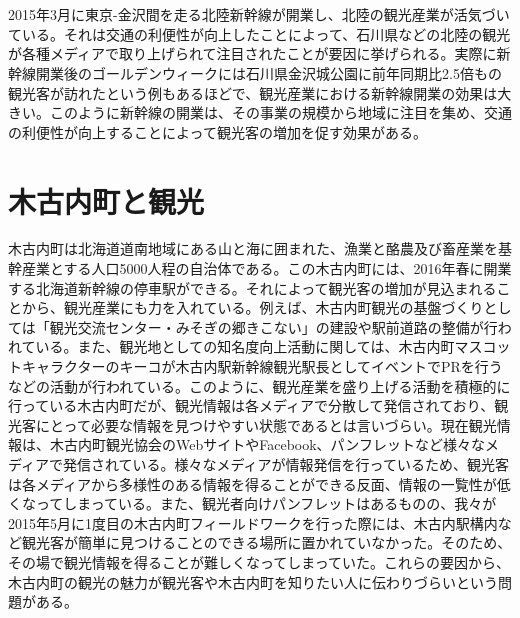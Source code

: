 \section{}
2015年3月に東京-金沢間を走る北陸新幹線が開業し、北陸の観光産業が活気づいている。それは交通の利便性が向上したことによって、石川県などの北陸の観光が各種メディアで取り上げられて注目されたことが要因に挙げられる。実際に新幹線開業後のゴールデンウィークには石川県金沢城公園に前年同期比2.5倍もの観光客が訪れたという例もあるほどで、観光産業における新幹線開業の効果は大きい。このように新幹線の開業は、その事業の規模から地域に注目を集め、交通の利便性が向上することによって観光客の増加を促す効果がある。

\section{木古内町と観光}
木古内町は北海道道南地域にある山と海に囲まれた、漁業と酪農及び畜産業を基幹産業とする人口5000人程の自治体である。この木古内町には、2016年春に開業する北海道新幹線の停車駅ができる。それによって観光客の増加が見込まれることから、観光産業にも力を入れている。例えば、木古内町観光の基盤づくりとしては「観光交流センター・みそぎの郷きこない」の建設や駅前道路の整備が行われている。また、観光地としての知名度向上活動に関しては、木古内町マスコットキャラクターのキーコが木古内駅新幹線観光駅長としてイベントでPRを行うなどの活動が行われている。このように、観光産業を盛り上げる活動を積極的に行っている木古内町だが、観光情報は各メディアで分散して発信されており、観光客にとって必要な情報を見つけやすい状態であるとは言いづらい。現在観光情報は、木古内町観光協会のWebサイト\cite{KIKONAI_HP}やFacebook、パンフレットなど様々なメディアで発信されている。様々なメディアが情報発信を行っているため、観光客は各メディアから多様性のある情報を得ることができる反面、情報の一覧性が低くなってしまっている。また、観光者向けパンフレットはあるものの、我々が2015年5月に1度目の木古内町フィールドワークを行った際には、木古内駅構内など観光客が簡単に見つけることのできる場所に置かれていなかった。そのため、その場で観光情報を得ることが難しくなってしまっていた。これらの要因から、木古内町の観光の魅力が観光客や木古内町を知りたい人に伝わりづらいという問題がある。

